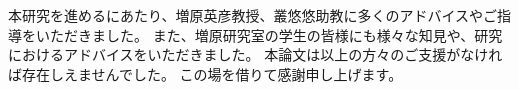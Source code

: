 本研究を進めるにあたり、増原英彦教授、叢悠悠助教に多くのアドバイスやご指導をいただきました。
また、増原研究室の学生の皆様にも様々な知見や、研究におけるアドバイスをいただきました。
本論文は以上の方々のご支援がなければ存在しえませんでした。
この場を借りて感謝申し上げます。
